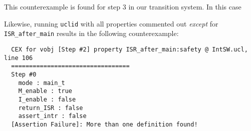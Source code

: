 \documentclass{article}
\newcommand{\code}[1]{\texttt{#1}}
\begin{document}
This counterexample is found for step 3 in our transition system. In this case 

Likewise, running \code{uclid} with all properties commented out \emph{except} for \code{ISR\_after\_main} results in the following counterexample:

\begin{lstlisting}
  CEX for vobj [Step #2] property ISR_after_main:safety @ IntSW.ucl, line 106
  =================================
  Step #0
    mode : main_t
    M_enable : true
    I_enable : false
    return_ISR : false
    assert_intr : false
  [Assertion Failure]: More than one definition found!
\end{lstlisting}
\end{document}
